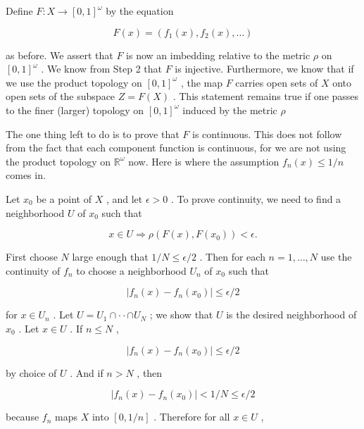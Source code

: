 \documentclass[10pt]{article}
\begin{document}
Define \(F : X \rightarrow  {\left\lbrack  0,1\right\rbrack  }^{\omega }\) by the equation

\[
F\left( x\right)  = \left( {{f}_{1}\left( x\right) ,{f}_{2}\left( x\right) ,\ldots }\right)
\]

as before. We assert that \(F\) is now an imbedding relative to the metric \(\rho\) on \({\left\lbrack  0,1\right\rbrack  }^{\omega }\) . We know from Step 2 that \(F\) is injective. Furthermore, we know that if we use the product topology on \({\left\lbrack  0,1\right\rbrack  }^{\omega }\) , the map \(F\) carries open sets of \(X\) onto open sets of the subspace \(Z = F\left( X\right)\) . This statement remains true if one passes to the finer (larger) topology on \({\left\lbrack  0,1\right\rbrack  }^{\omega }\) induced by the metric \(\rho\)

The one thing left to do is to prove that \(F\) is continuous. This does not follow from the fact that each component function is continuous, for we are not using the product topology on \({\mathbb{R}}^{\omega }\) now. Here is where the assumption \({f}_{n}\left( x\right)  \leq  1/n\) comes in.

Let \({x}_{0}\) be a point of \(X\) , and let \(\epsilon  > 0\) . To prove continuity, we need to find a neighborhood \(U\) of \({x}_{0}\) such that

\[
x \in  U \Rightarrow  \rho \left( {F\left( x\right) ,F\left( {x}_{0}\right) }\right)  < \epsilon .
\]

First choose \(N\) large enough that \(1/N \leq  \epsilon /2\) . Then for each \(n = 1,\ldots ,N\) use the continuity of \({f}_{n}\) to choose a neighborhood \({U}_{n}\) of \({x}_{0}\) such that

\[
\left| {{f}_{n}\left( x\right)  - {f}_{n}\left( {x}_{0}\right) }\right|  \leq  \epsilon /2
\]

for \(x \in  {U}_{n}\) . Let \(U = {U}_{1} \cap   \cdot   \cdot   \cap  {U}_{N}\) ; we show that \(U\) is the desired neighborhood of \({x}_{0}\) . Let \(x \in  U\) . If \(n \leq  N\) ,

\[
\left| {{f}_{n}\left( x\right)  - {f}_{n}\left( {x}_{0}\right) }\right|  \leq  \epsilon /2
\]

by choice of \(U\) . And if \(n > N\) , then

\[
\left| {{f}_{n}\left( x\right)  - {f}_{n}\left( {x}_{0}\right) }\right|  < 1/N \leq  \epsilon /2
\]

because \({f}_{n}\) maps \(X\) into \(\left\lbrack  {0,1/n}\right\rbrack\) . Therefore for all \(x \in  U\) ,
\end{document}
